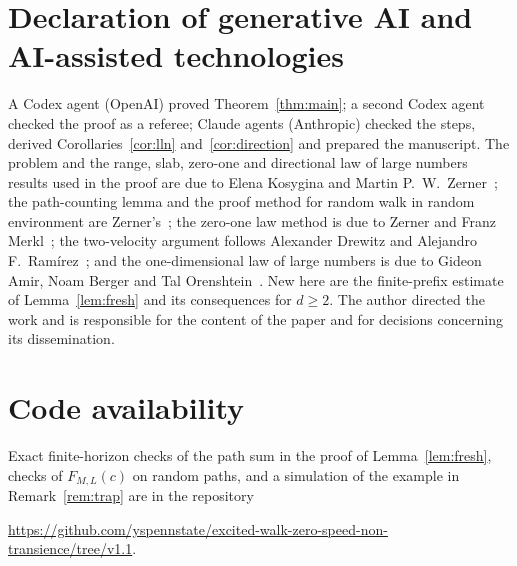 \documentclass[11pt]{amsart}
\theoremstyle{remark}
\begin{document}
\section*{Declaration of generative AI and AI-assisted technologies}
A Codex agent (OpenAI) proved Theorem~\ref{thm:main}; a second Codex agent checked the proof as a referee; Claude
agents (Anthropic) checked the steps, derived Corollaries~\ref{cor:lln} and~\ref{cor:direction} and prepared the
manuscript. The problem and the range, slab, zero-one and directional law of large numbers results used in the proof
are due to Elena Kosygina and Martin P.~W.~Zerner~\cite{KZ13}; the path-counting lemma and the proof method for random
walk in random environment are Zerner's~\cite{Zer02}; the zero-one law method is due to Zerner and Franz
Merkl~\cite{ZM01}; the two-velocity argument follows Alexander Drewitz and Alejandro F.~Ram\'irez~\cite{DR10}; and the
one-dimensional law of large numbers is due to Gideon Amir, Noam Berger and Tal Orenshtein~\cite{ABO16}. New here are
the finite-prefix estimate of Lemma~\ref{lem:fresh} and its consequences for $d\ge2$. The author directed the work and is
responsible for the content of the paper and for decisions concerning its dissemination.

\section*{Code availability}
Exact finite-horizon checks of the path sum in the proof of Lemma~\ref{lem:fresh}, checks of $F_{M,L}(c)$ on
random paths, and a simulation of the example in Remark~\ref{rem:trap} are in the repository
\begin{center}\url{https://github.com/yspennstate/excited-walk-zero-speed-non-transience/tree/v1.1}.\end{center}
\end{document}
